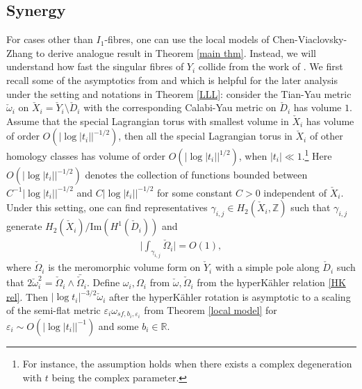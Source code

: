 \documentclass[11pt]{amsart}
\theoremstyle{plain}
\theoremstyle{definition}
\numberwithin{equation}{section}
\renewcommand{\epsilon}{\varepsilon}
\begin{document}
\subsection{Synergy} \label{sec: synergy}
	For cases other than $I_1$-fibres, one can use the local models of Chen-Viaclovsky-Zhang \cite{CVZ} to derive analogue result in Theorem \ref{main thm}. Instead, we will understand how fast the singular fibres of $Y_i$ collide from the work of \cite{LLL}. 
	We first recall some of the asymptotics from \cite{CJL} and \cite{LLL} which is helpful for the later analysis under the setting and notations in Theorem \ref{LLL}: consider the Tian-Yau metric $\check{\omega}_i$ on $\check{X}_i=\check{Y}_i\setminus \check{D}_i$ with the corresponding Calabi-Yau metric on $\check{D}_i$ has volume $1$. Assume that the special Lagrangian torus with smallest volume in $\check{X}_i$ has volume of order $O(|\log{|t_i|}|^{-1/2})$, then all the special Lagrangian torus in $\check{X}_i$ of other homology classes has volume of order $O(|\log{|t_i|}|^{1/2})$, when $|t_i|\ll 1$.\footnote{For instance, the assumption holds when there exists a complex degeneration with $t$ being the complex parameter.} Here $O(|\log{|t_i|}|^{-1/2})$ denotes the collection of functions bounded between $C^{-1}|\log{|t_i|}|^{-1/2}$ and $C|\log{|t_i|}|^{-1/2}$ for some constant $C>0$ independent of $\check{X}_i$. Under this setting, one can find representatives $\gamma_{i,j}\in H_2(\check{X}_i,\mathbb{Z})$ such that $\gamma_{i,j}$ generate $H_2(\check{X}_i)/\mbox{Im}(H^1(\check{D}_i))$ and 
	\begin{align} \label{other periods}
		\bigg|\int_{\gamma_{i,j}}\check{\Omega}_i\bigg|=O(1),
	\end{align} where $\check{\Omega}_i$ is the meromorphic volume form on $\check{Y}_i$ with a simple pole along $\check{D}_i$ such that $2\check{\omega}_i^2=\check{\Omega}_i\wedge \bar{\check{\Omega}}_i$. Define $\omega_i,\Omega_i$ from $\check{\omega},\check{\Omega}_i$ from the hyperK\"ahler relation \eqref{HK rel}. Then $|\log{t_i}|^{-3/2}\check{\omega}_i$ after the hyperK\"ahler rotation is asymptotic to a scaling of the semi-flat metric $\epsilon_i\omega_{sf,b_i,\epsilon_i}$ from Theorem \ref{local model} for $\epsilon_i\sim O(|\log{|t_i|}|^{-1})$ and some $b_i\in \mathbb{R}$. 
	
\end{document}
